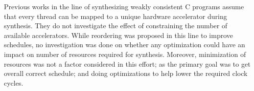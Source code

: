     Previous works in the line of synthesizing weakly consistent C programs assume that every thread can be mapped to a unique hardware accelerator during synthesis. 
    They do not investigate the effect of constraining the number of available accelerators.
    While reordering was proposed in this line to improve schedules, no investigation was done on whether any optimization could have an impact on number of resources required for synthesis. 
    Moreover, minimization of resources was not a factor considered in this effort; as the primary goal was to get overall correct schedule; and doing optimizations to help lower the required clock cycles. 




    